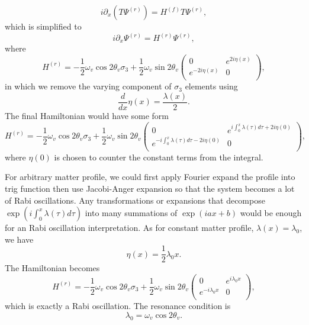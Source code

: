 \begin{equation}
    i \partial_x (T \Psi^{(r)}) = H^{(f)} T\Psi^{(r)},
\end{equation}
which is simplified to
\begin{equation}
    i \partial_x \Psi^{(r)} = H^{(r)} \Psi^{(r)},
\end{equation}
where
\begin{equation}
 H^{(r)} = - \frac{1}{2}\omega_v \cos 2\theta_v \sigma_3 + \frac{1}{2} \omega_v \sin 2\theta_v \begin{pmatrix}
   0 & e^{2i\eta(x)} \\
   e^{-2i\eta(x)} & 0 \\
   \end{pmatrix},
\end{equation}
in which we remove the varying component of $\sigma_3$ elements using
\begin{equation}
    \frac{d}{dx}\eta(x) = \frac{\lambda(x)}{2}.
\end{equation}
The final Hamiltonian would have some form
\begin{equation}
     H^{(r)} = - \frac{1}{2}\omega_v \cos 2\theta_v \sigma_3 + \frac{1}{2} \omega_v \sin 2\theta_v \begin{pmatrix}
   0 & e^{i\int_0^x \lambda(\tau)d\tau + 2i\eta(0)} \\
   e^{-i\int_0^x \lambda(\tau)d\tau - 2i\eta(0)} & 0 \\
   \end{pmatrix},
\end{equation}
where $\eta(0)$ is chosen to counter the constant terms from the integral.

For arbitrary matter profile, we could first apply Fourier expand the profile into trig function then use Jacobi-Anger expansion so that the system becomes a lot of Rabi oscillations.
Any transformations or expansions that decompose $\exp{\left(i\int_0^x \lambda(\tau)d\tau\right)}$ into many summations of $\exp{\left( i a x + b \right)}$ would be enough for an Rabi oscillation interpretation.
As for constant matter profile, $\lambda(x) = \lambda_0$, we have
\begin{equation}
     \eta(x) = \frac{1}{2} \lambda_0 x.
\end{equation}
The Hamiltonian becomes
\begin{equation}
     H^{(r)} = - \frac{1}{2}\omega_v \cos 2\theta_v \sigma_3 + \frac{1}{2} \omega_v \sin 2\theta_v \begin{pmatrix}
   0 & e^{i\lambda_0 x} \\
   e^{-i\lambda_0 x} & 0 \\
   \end{pmatrix},
\end{equation}
which is exactly a Rabi oscillation. The resonance condition is
\begin{equation}
   \lambda_0 = \omega_v \cos 2\theta_v. 
\end{equation}
   




